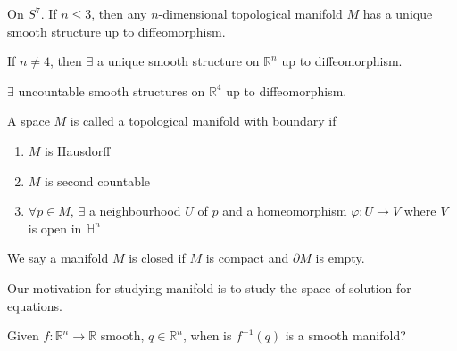 \begin{theorem}
    On  $ S^7  $. If  $ n \leq 3  $, then any  $ n  $-dimensional topological manifold  $ M  $ has a unique smooth structure up to diffeomorphism.
\end{theorem}
\begin{theorem}[Stallings]
    If  $ n\neq4  $, then  $ \exists  $ a unique smooth structure on  $ \mathbb{R}^n  $ up to diffeomorphism.
\end{theorem}
\begin{theorem}
     $ \exists  $ uncountable smooth structures on  $ \mathbb{R}^4 $ up to diffeomorphism. 
\end{theorem}
\begin{definition}
    A space  $ M  $ is called a topological manifold with boundary if 
    \begin{enumerate}
        \item  $ M  $ is Hausdorff
        \item  $ M  $ is second countable 
        \item  $ \forall  p\in M $,  $ \exists   $ a neighbourhood  $ U  $ of  $ p  $ and a homeomorphism  $ \varphi:U\rightarrow V    $  where  $ V  $ is open in  $ \mathbb{H}^n $ 
    \end{enumerate}
    We say a manifold  $ M  $ is closed if  $ M  $ is compact and  $ \partial M  $ is empty.
\end{definition}
Our motivation for studying manifold is to study the space of solution for equations.
\begin{question}
    Given  $ f:\mathbb{R}^n\rightarrow \mathbb{R} $ smooth,  $ q\in \mathbb{R}^n $, when is  $ f^{-1}(q)  $ is a smooth manifold?
\end{question}

